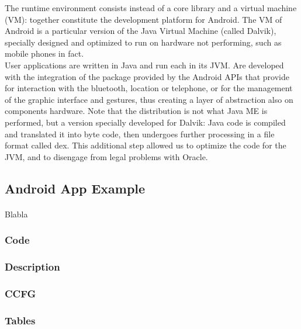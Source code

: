 \documentclass[letterpaper,twocolumn,10pt]{article}
\begin{document}
The runtime environment consists instead of a core library and a virtual machine (VM): together constitute the development platform for Android. The VM of Android is a particular version of the Java Virtual Machine (called Dalvik), specially designed and optimized to run on hardware not performing, such as mobile phones in fact.\\

User applications are written in Java and run each in its JVM. Are developed with the integration of the package provided by the Android APIs that provide for interaction with the bluetooth, location or telephone, or for the management of the graphic interface and gestures, thus creating a layer of abstraction also on components hardware. Note that the distribution is not what Java ME is performed, but a version specially developed for Dalvik: Java code is compiled and translated it into byte code, then undergoes further processing in a file format called dex. This additional step allowed us to optimize the code for the JVM, and to disengage from legal problems with Oracle.

\subsection{Android App Example}
\paragraph{}
Blabla

\subsubsection{Code}

\subsubsection{Description}

\subsubsection{CCFG}

\subsubsection{Tables}

\end{document}
